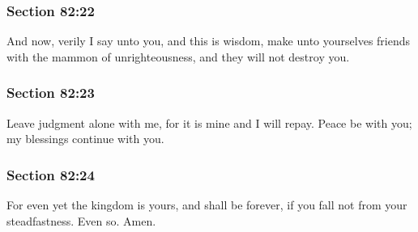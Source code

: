 	\subsubsection{Section 82:22} %
		\label{DC82-22}

		And now, verily I say unto you, and this is wisdom, make unto yourselves friends with the mammon of unrighteousness, and they will not destroy you.


	\subsubsection{Section 82:23} %
		\label{DC82-23}

		Leave judgment alone with me, for it is mine and I will repay.  Peace be with you; my blessings continue with you.


	\subsubsection{Section 82:24} %
		\label{DC82-24}

		For even yet the kingdom is yours, and shall be forever, if you fall not from your steadfastness.  Even so.  Amen.

